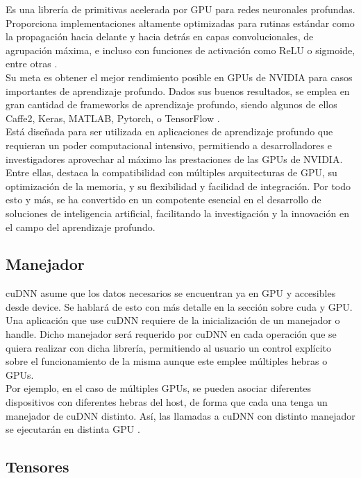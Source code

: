 Es una librería de primitivas acelerada por GPU para redes neuronales profundas. Proporciona implementaciones altamente optimizadas para rutinas estándar como la propagación hacia delante y hacia detrás en capas convolucionales, de agrupación máxima, e incluso con funciones de activación como ReLU o sigmoide, entre otras \cite{cuDNN}. \\
Su meta es obtener el mejor rendimiento posible en GPUs de NVIDIA para casos importantes de aprendizaje profundo. Dados sus buenos resultados, se emplea en gran cantidad de frameworks de aprendizaje profundo, siendo algunos de ellos Caffe2, Keras, MATLAB, Pytorch, o TensorFlow \cite{cuDNN_librerias}. \\
Está diseñada para ser utilizada en aplicaciones de aprendizaje profundo que requieran un poder computacional intensivo, permitiendo a desarrolladores e investigadores aprovechar al máximo las prestaciones de las GPUs de NVIDIA. Entre ellas, destaca la compatibilidad con múltiples arquitecturas de  GPU, su optimización de la memoria, y su flexibilidad y facilidad de integración. Por todo esto y más, se ha convertido en un compotente esencial en el desarrollo de soluciones de inteligencia artificial, facilitando la investigación y la innovación en el campo del aprendizaje profundo.


\subsection{Manejador}

cuDNN asume que los datos necesarios se encuentran ya en GPU y accesibles desde device. Se hablará de esto con más detalle en la sección sobre cuda y GPU. \\
Una aplicación que use cuDNN requiere de la inicialización de un manejador o handle. Dicho manejador será requerido por cuDNN en cada operación que se quiera realizar con dicha librería, permitiendo al usuario un control explícito sobre el funcionamiento de la misma aunque este emplee múltiples hebras o GPUs. \\
Por ejemplo, en el caso de múltiples GPUs, se pueden asociar diferentes dispositivos con diferentes hebras del host, de forma que cada una tenga un manejador de cuDNN distinto. Así, las llamadas a cuDNN con distinto manejador se ejecutarán en distinta GPU \cite{cuDNN_core_concepts}.

\subsection{Tensores}

